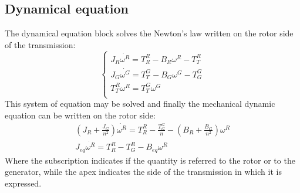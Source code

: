 \subsection{Dynamical equation}
The dynamical equation block solves the Newton's law written on the rotor side of the transmission:
\begin{equation}
    \begin{cases}
      J_R \dot{\omega^R} = T_R^R - B_R\omega^R - T_T^R\\
      J_G \dot{\omega^G} = T_T^G - B_G\omega^G - T_G^G\\
      T_T^R\omega^R = T_T^G\omega^G\\
    \end{cases}
\end{equation}
This system of equation may be solved and finally the mechanical dynamic equation can be written on the rotor side:
\begin{gather}
    \left(J_R + \frac{J_G}{n^2}\right) \dot{\omega^R} = T_R^R - \frac{T_G^G}{n} - \left(B_R + \frac{B_G}{n^2}\right)\omega^R \\
    J_{eq} \dot{\omega^R} = T_R^R - T_G^R - B_{eq}\omega^R
    \label{eq:mech_eq}
\end{gather}
Where the subscription indicates if the quantity is referred to the rotor or to the generator, while the apex indicates the side of the transmission in which it is expressed.

